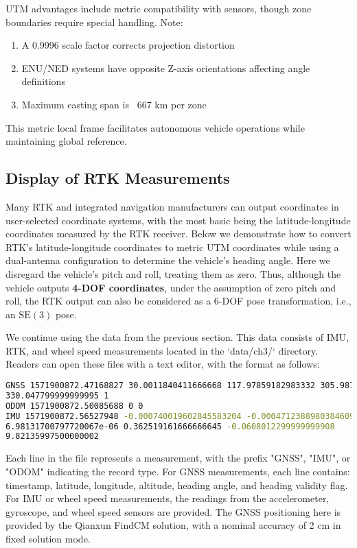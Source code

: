 UTM advantages include metric compatibility with sensors, though zone boundaries require special handling. Note:
\begin{enumerate}
	\item A 0.9996 scale factor corrects projection distortion
	\item ENU/NED systems have opposite Z-axis orientations affecting angle definitions
	\item Maximum easting span is ~667 km per zone
\end{enumerate}

This metric local frame facilitates autonomous vehicle operations while maintaining global reference.

\subsection{Display of RTK Measurements}
Many RTK and integrated navigation manufacturers can output coordinates in user-selected coordinate systems, with the most basic being the latitude-longitude coordinates measured by the RTK receiver. Below we demonstrate how to convert RTK's latitude-longitude coordinates to metric UTM coordinates while using a dual-antenna configuration to determine the vehicle's heading angle. Here we disregard the vehicle's pitch and roll, treating them as zero. Thus, although the vehicle outputs \textbf{4-DOF coordinates}, under the assumption of zero pitch and roll, the RTK output can also be considered as a 6-DOF pose transformation, i.e., an $\mathrm{SE}(3)$ pose.

We continue using the data from the previous section. This data consists of IMU, RTK, and wheel speed measurements located in the `data/ch3/` directory. Readers can open these files with a text editor, with the format as follows:

\begin{lstlisting}[language=sh, caption=Example data file]
GNSS 1571900872.47168827 30.0011840411666668 117.97859182983332 305.98748779296875 
330.047799999999995 1
ODOM 1571900872.50085688 0 0
IMU 1571900872.56527948 -0.000740019602845583204 -0.000471238898038460995 
6.98131700797720067e-06 0.362519161666666645 -0.0608012299999999908 
9.82135997500000002
\end{lstlisting}

Each line in the file represents a measurement, with the prefix "GNSS", "IMU", or "ODOM" indicating the record type. For GNSS measurements, each line contains: timestamp, latitude, longitude, altitude, heading angle, and heading validity flag. For IMU or wheel speed measurements, the readings from the accelerometer, gyroscope, and wheel speed sensors are provided. The GNSS positioning here is provided by the Qianxun FindCM solution, with a nominal accuracy of 2 cm in fixed solution mode.

